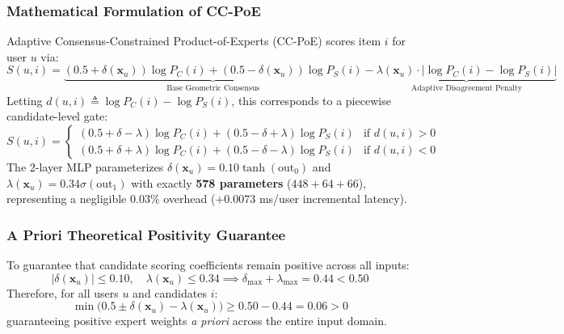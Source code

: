 \subsubsection{Mathematical Formulation of CC-PoE}
Adaptive Consensus-Constrained Product-of-Experts (CC-PoE) scores item $i$ for user $u$ via:
\begin{equation}
    S(u, i) = \underbrace{(0.5 + \delta(\mathbf{x}_u)) \log P_C(i) + (0.5 - \delta(\mathbf{x}_u)) \log P_S(i)}_{\text{Base Geometric Consensus}} - \underbrace{\lambda(\mathbf{x}_u) \cdot |\log P_C(i) - \log P_S(i)|}_{\text{Adaptive Disagreement Penalty}}
\end{equation}
Letting $d(u, i) \triangleq \log P_C(i) - \log P_S(i)$, this corresponds to a piecewise candidate-level gate:
\begin{equation}
    S(u, i) = \begin{cases} 
    (0.5 + \delta - \lambda) \log P_C(i) + (0.5 - \delta + \lambda) \log P_S(i) & \text{if } d(u, i) > 0 \\
    (0.5 + \delta + \lambda) \log P_C(i) + (0.5 - \delta - \lambda) \log P_S(i) & \text{if } d(u, i) < 0 
    \end{cases}
\end{equation}
The 2-layer MLP parameterizes $\delta(\mathbf{x}_u) = 0.10 \tanh(\text{out}_0)$ and $\lambda(\mathbf{x}_u) = 0.34 \sigma(\text{out}_1)$ with exactly \textbf{578 parameters} ($448 + 64 + 66$), representing a negligible $0.03\%$ overhead ($+0.0073$ ms/user incremental latency).

\subsubsection{A Priori Theoretical Positivity Guarantee}
To guarantee that candidate scoring coefficients remain positive across all inputs:
\begin{equation}
    |\delta(\mathbf{x}_u)| \le 0.10, \quad \lambda(\mathbf{x}_u) \le 0.34 \implies \delta_{\max} + \lambda_{\max} = 0.44 < 0.50
\end{equation}
Therefore, for all users $u$ and candidates $i$:
\begin{equation}
    \min \big(0.5 \pm \delta(\mathbf{x}_u) - \lambda(\mathbf{x}_u)\big) \ge 0.50 - 0.44 = \mathbf{0.06} > 0
\end{equation}
guaranteeing positive expert weights \emph{a priori} across the entire input domain.


